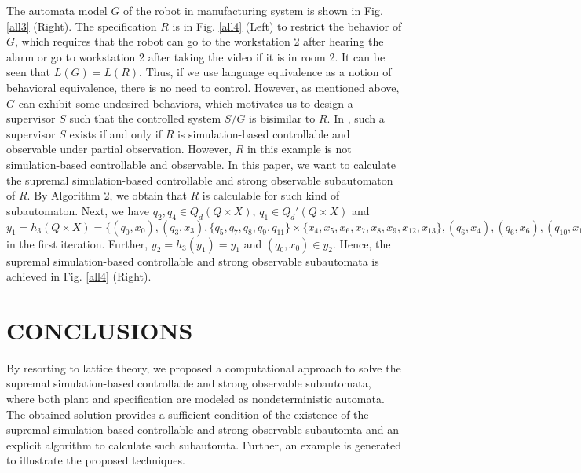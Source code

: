 \documentclass[12pt,draftcls,onecolumn]{IEEEtran}
\begin{document}
The automata model $G$ of the robot in manufacturing system is shown
in Fig. \ref{all3} (Right). The specification $R$ is in Fig.
\ref{all4} (Left) to restrict the behavior of $G$, which requires
that the robot can go to the workstation 2 after hearing the alarm
or go to workstation 2 after taking the video if it is in room 2. It
can be seen that $L(G)=L(R)$. Thus, if we use language equivalence
as a notion of behavioral equivalence, there is no need to control.
However, as mentioned above, $G$ can exhibit some undesired
behaviors, which motivates us to design a supervisor $S$ such that
the controlled system $S/G$ is bisimilar to $R$. In \cite{liu}, such
a supervisor $S$ exists if and only if $R$ is simulation-based
controllable and observable under partial observation. However, $R$
in this example is not simulation-based controllable and observable.
In this paper, we want to calculate the supremal simulation-based
controllable and strong observable subautomaton of $R$. By Algorithm
2, we obtain that $R$ is calculable for such kind of subautomaton.
Next, we have $q_2, q_4 \in Q_d(Q \times X)$, $q_1 \in Q_{d}'(Q
\times X)$ and $y_1=h_3(Q \times X)= \{(q_0, x_0), (q_3, x_3),
\{q_5, q_7, q_8, q_9, q_{11}\} \times \{x_4, x_5, x_6, x_7, x_8,
x_9, x_{12}, x_{13}\}, (q_6, x_4), (q_6, x_6), (q_{10}, x_{10}),
(q_{10}, x_{11}), (q_{12}, x_{14})\}$ in the first iteration.
Further, $y_2=h_3(y_1)=y_1$ and $(q_0, x_0) \in y_2$. Hence, the
supremal simulation-based controllable and strong observable
subautomata is achieved in Fig. \ref{all4} (Right).







\section{CONCLUSIONS}

By resorting to lattice theory, we proposed a computational approach
to solve the supremal simulation-based controllable and strong
observable subautomata, where both plant and specification are
modeled as nondeterministic automata. The obtained solution provides
a sufficient condition of the existence of the supremal
simulation-based controllable and strong observable subautomta and
an explicit algorithm to calculate such subautomta. Further, an
example is generated to illustrate the proposed techniques.
\end{document}
